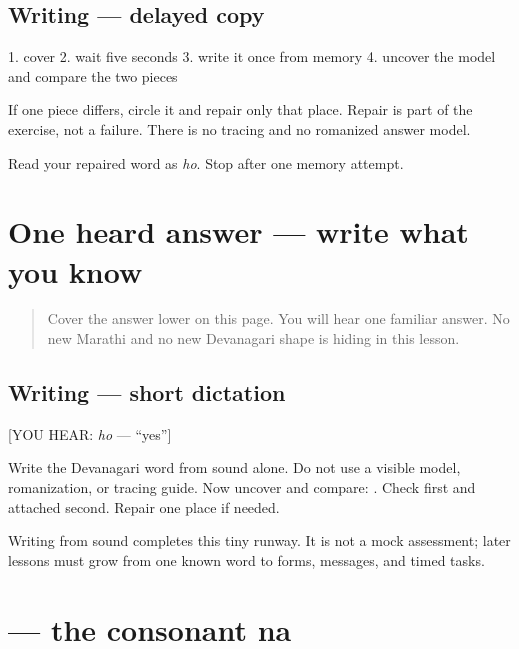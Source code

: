 \subsection*{Writing — delayed copy}
1. cover \textbf{} 2. wait five seconds 3. write it once from memory 4. uncover the model and compare the two pieces

If one piece differs, circle it and repair only that place. Repair is part of the exercise, not a failure. There is no tracing and no romanized answer model.

\begin{tcolorbox}[breakable,colback=teal!4,colframe=teal!35!black,title={Before you move on}]
Read your repaired word as \emph{ho}. Stop after one memory attempt.
\end{tcolorbox}
\section[ho]{One heard answer — write what you know}

\label{lesson:MR-W01-ho-dictation}



\begin{quote}
Cover the answer lower on this page. You will hear one familiar answer. No new Marathi and no new Devanagari shape is hiding in this lesson.
\end{quote}

\subsection*{Writing — short dictation}
{[}YOU HEAR: \emph{ho} — \textquotedblleft{}yes\textquotedblright{}{]}

Write the Devanagari word from sound alone. Do not use a visible model, romanization, or tracing guide. Now uncover and compare: \textbf{}. Check \textbf{} first and attached \textbf{} second. Repair one place if needed.

\begin{tcolorbox}[breakable,colback=teal!4,colframe=teal!35!black,title={Before you move on}]
Writing from sound completes this tiny runway. It is not a mock assessment; later lessons must grow from one known word to forms, messages, and timed tasks.
\end{tcolorbox}
\section[na]{ — the consonant na}

